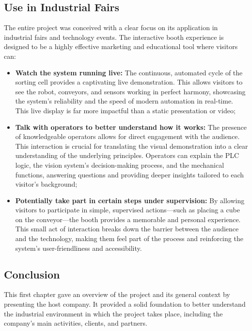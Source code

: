 \subsection{Use in Industrial Fairs}
The entire project was conceived with a clear focus on its application in industrial fairs and technology events. The interactive booth experience is designed to be a highly effective marketing and educational tool where visitors can:

\begin{itemize}
\item \textbf{Watch the system running live:} The continuous, automated cycle of the sorting cell provides a captivating live demonstration. This allows visitors to see the robot, conveyors, and sensors working in perfect harmony, showcasing the system's reliability and the speed of modern automation in real-time. This live display is far more impactful than a static presentation or video;
\item \textbf{Talk with operators to better understand how it works:} The presence of knowledgeable operators allows for direct engagement with the audience. This interaction is crucial for translating the visual demonstration into a clear understanding of the underlying principles. Operators can explain the PLC logic, the vision system's decision-making process, and the mechanical functions, answering questions and providing deeper insights tailored to each visitor's background;
\item \textbf{Potentially take part in certain steps under supervision:} By allowing visitors to participate in simple, supervised actions—such as placing a cube on the conveyor—the booth provides a memorable and personal experience. This small act of interaction breaks down the barrier between the audience and the technology, making them feel part of the process and reinforcing the system's user-friendliness and accessibility.
\end{itemize}

\subsection{Conclusion}
This first chapter gave an overview of the project and its general context by presenting the host company. It provided a solid foundation to better understand the industrial environment in which the project takes place, including the company's main activities, clients, and partners.